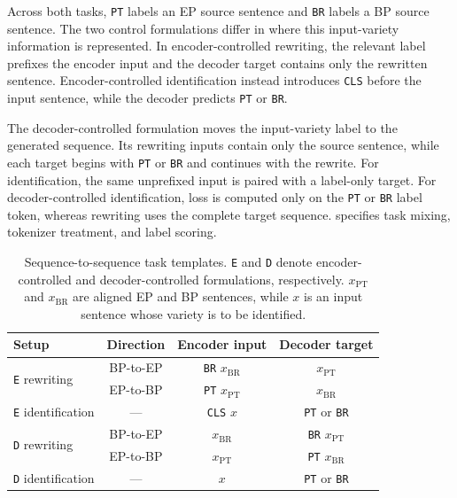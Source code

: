 \documentclass[acmtog,nonacm]{acmart}
\begin{document}
Across both tasks, \texttt{PT} labels an EP source sentence and \texttt{BR}
labels a BP source sentence. The two control formulations differ in where
this input-variety information is represented. In encoder-controlled
rewriting, the relevant label prefixes the encoder input and the decoder target
contains only the rewritten sentence. Encoder-controlled identification
instead introduces \texttt{CLS} before the input sentence, while the decoder
predicts \texttt{PT} or \texttt{BR}.

The decoder-controlled formulation moves the input-variety label to the
generated sequence. Its rewriting inputs contain only the source sentence,
while each target begins with \texttt{PT} or \texttt{BR} and continues with
the rewrite. For identification, the same unprefixed input is paired with a
label-only target. For decoder-controlled identification, loss is computed only
on the \texttt{PT} or \texttt{BR} label token, whereas rewriting uses the
complete target sequence.  specifies task mixing, tokenizer treatment,
and label scoring.

\begin{table}[t]
  \centering
  \small
  \renewcommand{\arraystretch}{1.18}
  \setlength{\tabcolsep}{5pt}
  \caption{Sequence-to-sequence task templates. \texttt{E} and \texttt{D}
  denote encoder-controlled and decoder-controlled formulations,
  respectively. \(x_{\mathrm{PT}}\) and \(x_{\mathrm{BR}}\) are aligned EP
  and BP sentences, while \(x\) is an input sentence whose variety is to be
  identified.}
  \label{tab:training-templates}
  \begin{tabular}{@{}lccc@{}}
    \toprule
    \textbf{Setup} & \textbf{Direction} & \textbf{Encoder input} &
    \textbf{Decoder target} \\
    \midrule
    \multirow{2}{*}{\texttt{E} rewriting} &
    BP-to-EP & \texttt{BR} \(x_{\mathrm{BR}}\) &
    \(x_{\mathrm{PT}}\) \\
    & EP-to-BP & \texttt{PT} \(x_{\mathrm{PT}}\) &
    \(x_{\mathrm{BR}}\) \\
    \addlinespace[0.35em]
    \texttt{E} identification &
    --- & \texttt{CLS} \(x\) &
    \texttt{PT} or \texttt{BR} \\
    \midrule
    \multirow{2}{*}{\texttt{D} rewriting} &
    BP-to-EP & \(x_{\mathrm{BR}}\) &
    \texttt{BR} \(x_{\mathrm{PT}}\) \\
    & EP-to-BP & \(x_{\mathrm{PT}}\) &
    \texttt{PT} \(x_{\mathrm{BR}}\) \\
    \addlinespace[0.35em]
    \texttt{D} identification &
    --- & \(x\) &
    \texttt{PT} or \texttt{BR} \\
    \bottomrule
  \end{tabular}
\end{table}
\end{document}
